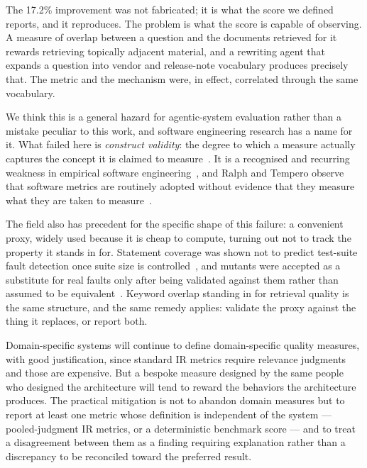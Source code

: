 \documentclass[acmsmall,review,anonymous,screen]{acmart}
\begin{document}
The 17.2\% improvement was not fabricated; it is what the score we defined
reports, and it reproduces. The problem is what the score is capable of
observing. A measure of overlap between a question and the documents retrieved
for it rewards retrieving topically adjacent material, and a rewriting agent
that expands a question into vendor and release-note vocabulary produces
precisely that. The metric and the mechanism were, in effect, correlated
through the same vocabulary.

We think this is a general hazard for agentic-system evaluation rather than a
mistake peculiar to this work, and software engineering research has a name for
it. What failed here is \emph{construct validity}: the degree to which a measure
actually captures the concept it is claimed to measure~\cite{wohlin2012experimentation,
kitchenham2002guidelines}. It is a recognised and recurring weakness in empirical
software engineering~\cite{sjoberg2007future,siegmund2015validity,verdecchia2023threats,lago2024threats},
and Ralph and Tempero observe that software metrics are routinely adopted without
evidence that they measure what they are taken to measure~\cite{ralph2018construct}.

The field also has precedent for the specific shape of this failure: a
convenient proxy, widely used because it is cheap to compute, turning out not to
track the property it stands in for. Statement coverage was shown not to predict
test-suite fault detection once suite size is controlled~\cite{inozemtseva2014coverage},
and mutants were accepted as a substitute for real faults only after being
validated against them rather than assumed to be
equivalent~\cite{just2014mutants,papadakis2018mutation}. Keyword overlap standing in
for retrieval quality is the same structure, and the same remedy applies:
validate the proxy against the thing it replaces, or report both.

Domain-specific systems will continue to define domain-specific quality measures,
with good justification, since standard IR metrics require relevance judgments and
those are expensive. But a bespoke measure designed by the same people who
designed the architecture will tend to reward the behaviors the architecture
produces. The practical mitigation is not to abandon domain measures but to
report at least one metric whose definition is independent of the system ---
pooled-judgment IR metrics, or a deterministic benchmark score --- and to treat a
disagreement between them as a finding requiring explanation rather than a
discrepancy to be reconciled toward the preferred result.
\end{document}
